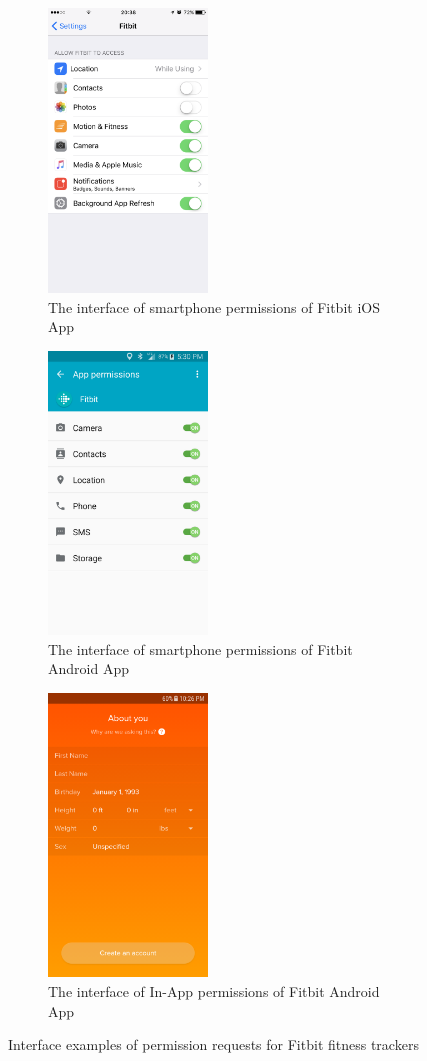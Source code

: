 \begin{figure}
	\centering
	\begin{subfigure}[b]{0.33\linewidth}
		\centering
		\includegraphics[width=120pt]{figures/ios.png}
		\caption{The interface of smartphone permissions of Fitbit iOS App}
		\label{fig:iosS}
	\end{subfigure}%
	\begin{subfigure}[b]{0.33\linewidth}
		\centering
		\includegraphics[width=120pt]{figures/android6.png}
		\caption{The interface of smartphone permissions of Fitbit Android App}
		\label{fig:androidS}
	\end{subfigure}
	\begin{subfigure}[b]{0.33\linewidth}
		\centering
		\includegraphics[width=120pt]{figures/Aset.png}
		\caption{The interface of In-App permissions of Fitbit Android App}
		\label{fig:fitbitA}
	\end{subfigure}
	\caption{Interface examples of permission requests for Fitbit fitness trackers}
\end{figure}


